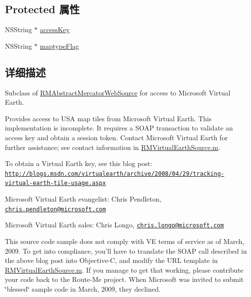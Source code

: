 \subsection*{Protected 属性}
\begin{DoxyCompactItemize}
\item 
N\-S\-String $\ast$ \hyperlink{interface_r_m_virtual_earth_source_a1cb125def16c266a7fa0b36e6e676df1}{access\-Key}
\item 
N\-S\-String $\ast$ \hyperlink{interface_r_m_virtual_earth_source_a77400af8873105e2d8f28ac76f26cf40}{maptype\-Flag}
\end{DoxyCompactItemize}


\subsection{详细描述}
Subclass of \hyperlink{interface_r_m_abstract_mercator_web_source}{R\-M\-Abstract\-Mercator\-Web\-Source} for access to Microsoft Virtual Earth. 

Provides access to U\-S\-A map tiles from Microsoft Virtual Earth. This implementation is incomplete. It requires a S\-O\-A\-P transaction to validate an access key and obtain a session token. Contact Microsoft Virtual Earth for further assistance; see contact information in \hyperlink{_r_m_virtual_earth_source_8m}{R\-M\-Virtual\-Earth\-Source.\-m}.

To obtain a Virtual Earth key, see this blog post\-: \href{http://blogs.msdn.com/virtualearth/archive/2008/04/29/tracking-virtual-earth-tile-usage.aspx}{\tt http\-://blogs.\-msdn.\-com/virtualearth/archive/2008/04/29/tracking-\/virtual-\/earth-\/tile-\/usage.\-aspx}

Microsoft Virtual Earth evangelist\-: Chris Pendleton, \href{mailto:chris.pendleton@microsoft.com}{\tt chris.\-pendleton@microsoft.\-com}

Microsoft Virtual Earth sales\-: Chris Longo, \href{mailto:chris.longo@microsoft.com}{\tt chris.\-longo@microsoft.\-com}

This source code sample does not comply with V\-E terms of service as of March, 2009. To get into compliance, you'll have to translate the S\-O\-A\-P call described in the above blog post into Objective-\/\-C, and modify the U\-R\-L template in \hyperlink{_r_m_virtual_earth_source_8m}{R\-M\-Virtual\-Earth\-Source.\-m}. If you manage to get that working, please contribute your code back to the Route-\/\-Me project. When Microsoft was invited to submit \char`\"{}blessed\char`\"{} sample code in March, 2009, they declined. 

